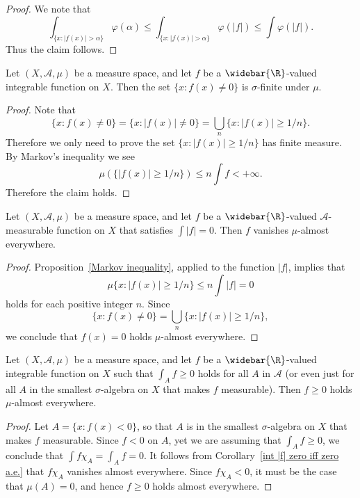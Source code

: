 \begin{proof}
We note that
\[\int_{\{x:|f(x)|>\alpha\}}\varphi(\alpha)\leq\int_{\{x:|f(x)|>\alpha\}}\varphi(|f|)\leq\int\varphi(|f|).\]
Thus the claim follows.
\end{proof}
\begin{corollary}\label{integrable nonzero set is sigma-finite}
Let $(X,\mathcal{A},\mu)$ be a measure space, and let $f$ be a $\widebar{\R}$-valued integrable function on $X$. Then the set $\{x:f(x)\neq 0\}$ is $\sigma$-finite under $\mu$.
\end{corollary}
\begin{proof}
Note that
\[\{x:f(x)\neq 0\}=\{x:|f(x)|\neq 0\}=\bigcup_{n}\{x:|f(x)|\geq 1/n\}.\]
Therefore we only need to prove the set $\{x:|f(x)|\geq 1/n\}$ has finite measure. By Markov's inequality we see
\[\mu(\{|f(x)|\geq 1/n\})\leq n\int f<+\infty.\]
Therefore the claim holds.
\end{proof}
\begin{corollary}\label{int |f| zero iff zero a.e.}
Let $(X,\mathcal{A},\mu)$ be a measure space, and let $f$ be a $\widebar{\R}$-valued $\mathcal{A}$-measurable function on $X$ that satisfies $\int|f|=0$. Then $f$ vanishes $\mu$-almost everywhere.
\end{corollary}
\begin{proof}
Proposition~\ref{Markov inequality}, applied to the function $|f|$, implies that
\[\mu\{x:|f(x)|\geq 1/n\}\leq n\int|f|=0\]
holds for each positive integer $n$. Since
\[\{x:f(x)\neq 0\}=\bigcup_n\{x:|f(x)|\geq 1/n\},\]
we conclude that $f(x)=0$ holds $\mu$-almost everywhere.
\end{proof}
\begin{corollary}
Let $(X,\mathcal{A},\mu)$ be a measure space, and let $f$ be a $\widebar{\R}$-valued integrable function on $X$ such that $\int_Af\geq 0$ holds for all $A$ in $\mathcal{A}$ (or even just for all $A$ in the smallest $\sigma$-algebra on $X$ that makes $f$ measurable). Then $f\geq 0$ holds $\mu$-almost everywhere.
\end{corollary}
\begin{proof}
Let $A=\{x:f(x)<0\}$, so that $A$ is in the smallest $\sigma$-algebra on $X$ that makes $f$ measurable. Since $f<0$ on $A$, yet we are assuming that $\int_A f\geq 0$, we conclude that $\int f\chi_A=\int_Af=0$. It follows from Corollary~\ref{int |f| zero iff zero a.e.} that $f\chi_A$ vanishes almost everywhere. Since $f\chi_A<0$, it must be the case that $\mu(A)=0$, and hence $f\geq 0$ holds almost everywhere.
\end{proof}
